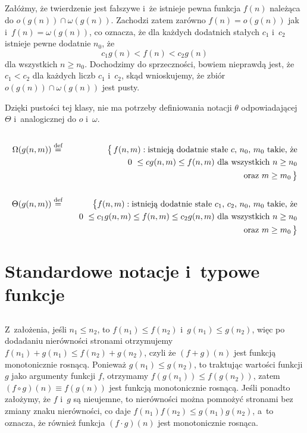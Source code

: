 \subsection{} %
Załóżmy, że twierdzenie jest fałszywe i~że istnieje pewna funkcja $f(n)$ należąca do $o(g(n))\cap\omega(g(n))$. Zachodzi zatem zarówno $f(n)=o(g(n))$ jak i~$f(n)=\omega(g(n))$, co oznacza, że dla każdych dodatnich stałych $c_1$ i~$c_2$ istnieje pewne dodatnie $n_0$, że
\[
	c_1g(n) < f(n) < c_2g(n)
\]
dla wszystkich $n\ge n_0$. Dochodzimy do sprzeczności, bowiem nieprawdą jest, że $c_1<c_2$ dla każdych liczb $c_1$ i~$c_2$, skąd wnioskujemy, że zbiór $o(g(n))\cap\omega(g(n))$ jest pusty.

Dzięki pustości tej klasy, nie ma potrzeby definiowania notacji $\theta$ odpowiadającej $\Theta$ i~analogicznej do $o$ i~$\omega$.

\subsection{} %
\begin{eqnarray*}
	\Omega(g(n,m)) &\stackrel{\text{\scriptsize def}}{=}& \bigl\{\,f(n,m):\text{istnieją dodatnie stałe $c$,~$n_0$,~$m_0$ takie, że} \\
	&& \quad 0~\le cg(n,m) \le \text{$f(n,m)$ dla wszystkich $n\ge n_0$} \\
	&& \quad\text{oraz $m\ge m_0$}\,\bigr\} \\\\
	\Theta(g(n,m)) &\stackrel{\text{\scriptsize def}}{=}& \bigl\{f(n,m):\text{istnieją dodatnie stałe $c_1$,~$c_2$,~$n_0$,~$m_0$ takie, że} \\
	&& \quad 0~\le c_1g(n,m) \le f(n,m) \le \text{$c_2g(n,m)$ dla wszystkich $n\ge n_0$} \\
	&& \quad\text{oraz $m\ge m_0$}\,\bigr\}
\end{eqnarray*}

\section{Standardowe notacje i~typowe funkcje}

\subsection{} %
Z~założenia, jeśli $n_1\le n_2$, to $f(n_1)\le f(n_2)$ i~$g(n_1)\le g(n_2)$, więc po dodadaniu nierówności stronami otrzymujemy $f(n_1)+g(n_1)\le f(n_2)+g(n_2)$, czyli że $(f+g)(n)$ jest funkcją monotonicznie rosnącą. Ponieważ $g(n_1)\le g(n_2)$, to traktując wartości funkcji $g$ jako argumenty funkcji $f$, otrzymamy $f(g(n_1))\le f(g(n_2))$, zatem $(f\circ g)(n)\equiv f(g(n))$ jest funkcją monotonicznie rosnącą. Jeśli ponadto założymy, że $f$ i~$g$ są nieujemne, to nierówności można pomnożyć stronami bez zmiany znaku nierówności, co daje $f(n_1)f(n_2)\le g(n_1)g(n_2)$, a~to oznacza, że również funkcja $(f\cdot g)(n)$ jest monotonicznie rosnąca.

